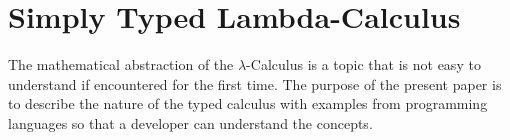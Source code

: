 \section{Simply Typed Lambda-Calculus}

The mathematical abstraction of the $\lambda$-Calculus
is a topic that is not easy to understand if encountered
for the first time. The purpose of the present paper is to
describe the nature of the typed calculus with examples from
programming languages so that a developer can understand the
concepts.











